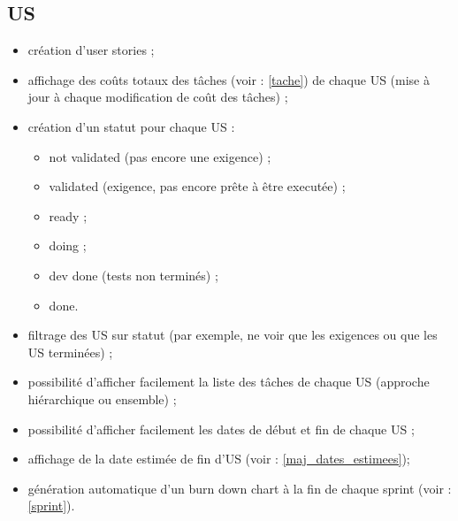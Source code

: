 \subsection{US}
\begin{itemize}
\item cr\'eation d'user stories ;
\item affichage des co\^uts totaux des t\^aches (voir : \ref{tache}) de chaque US (mise \`a jour \`a chaque modification de co\^ut des t\^aches) ;
\item cr\'eation d'un statut pour chaque US :
\begin{itemize}
\item not validated (pas encore une exigence) ;
\item validated (exigence, pas encore pr\^ete \`a \^etre execut\'ee) ;
\item ready ;
\item doing ;
\item dev done (tests non termin\'es) ;
\item done.
\end{itemize}
\item filtrage des US sur statut (par exemple, ne voir que les exigences ou que les US termin\'ees) ;
\item possibilit\'e d'afficher facilement la liste des t\^aches de chaque US (approche hi\'erarchique ou ensemble) ;
\item possibilit\'e d'afficher facilement les dates de d\'ebut et fin de chaque US ;
\item affichage de la date estim\'ee de fin d'US (voir : \ref{maj_dates_estimees});
\item g\'en\'eration automatique d'un burn down chart \`a la fin de chaque sprint (voir : \ref{sprint}).
\end{itemize}
